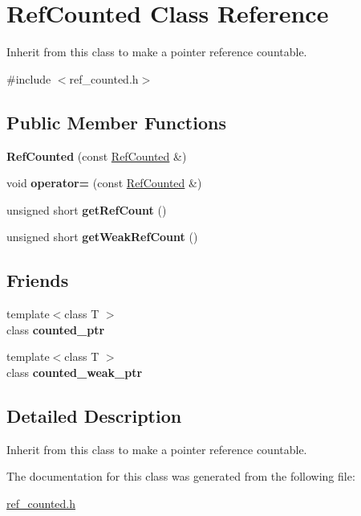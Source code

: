 \hypertarget{classRefCounted}{}\section{Ref\+Counted Class Reference}
\label{classRefCounted}


Inherit from this class to make a pointer reference countable.  




{\ttfamily \#include $<$ref\+\_\+counted.\+h$>$}

\subsection*{Public Member Functions}
\begin{DoxyCompactItemize}
\item 
\hypertarget{classRefCounted_a057d7ef6c63b4e35290b84ccf144d0d6}{}{\bfseries Ref\+Counted} (const \hyperlink{classRefCounted}{Ref\+Counted} \&)\label{classRefCounted_a057d7ef6c63b4e35290b84ccf144d0d6}

\item 
\hypertarget{classRefCounted_a50f27566705e5fa9d10da5236ee96f0f}{}void {\bfseries operator=} (const \hyperlink{classRefCounted}{Ref\+Counted} \&)\label{classRefCounted_a50f27566705e5fa9d10da5236ee96f0f}

\item 
\hypertarget{classRefCounted_a198f77582abe9415422141bedd708b29}{}unsigned short {\bfseries get\+Ref\+Count} ()\label{classRefCounted_a198f77582abe9415422141bedd708b29}

\item 
\hypertarget{classRefCounted_a0b5c7cc1e395a1d9df93d9141f037fb9}{}unsigned short {\bfseries get\+Weak\+Ref\+Count} ()\label{classRefCounted_a0b5c7cc1e395a1d9df93d9141f037fb9}

\end{DoxyCompactItemize}
\subsection*{Friends}
\begin{DoxyCompactItemize}
\item 
\hypertarget{classRefCounted_abf29d1b6b221e60964e0852b2518841a}{}{\footnotesize template$<$class T $>$ }\\class {\bfseries counted\+\_\+ptr}\label{classRefCounted_abf29d1b6b221e60964e0852b2518841a}

\item 
\hypertarget{classRefCounted_a0ca920da2b630f3f0b295d6d83bb565b}{}{\footnotesize template$<$class T $>$ }\\class {\bfseries counted\+\_\+weak\+\_\+ptr}\label{classRefCounted_a0ca920da2b630f3f0b295d6d83bb565b}

\end{DoxyCompactItemize}


\subsection{Detailed Description}
Inherit from this class to make a pointer reference countable. 

The documentation for this class was generated from the following file\+:\begin{DoxyCompactItemize}
\item 
\hyperlink{ref__counted_8h}{ref\+\_\+counted.\+h}\end{DoxyCompactItemize}
